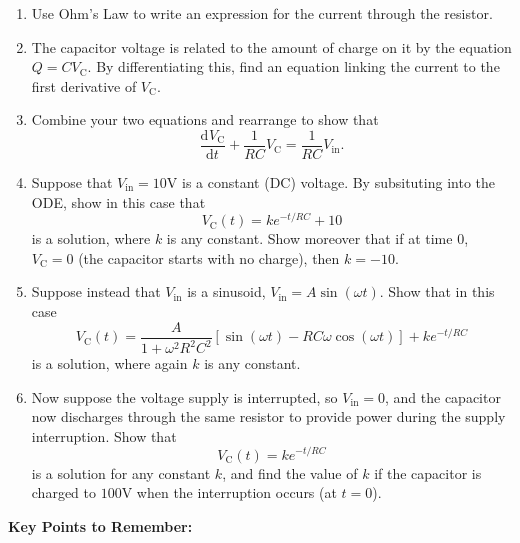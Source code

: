 \documentclass{article}
\newcommand{\deriv}[3][]{\frac{\mathrm{d}^{#1}#2}{\mathrm{d}#3^{#1}}}
\begin{document}
\begin{enumerate}
	\item Use Ohm's Law to write an expression for the current through the resistor. %
	\item The capacitor voltage is related to the amount of charge on it by the equation $Q=CV_\mathrm{C}$. By differentiating this, find an equation linking the current to the first derivative of $V_\mathrm{C}$. %
	\item Combine your two equations and rearrange to show that
		\[\deriv{V_\mathrm{C}}{t}+\frac{1}{RC}V_\mathrm{C} = \frac{1}{RC} V_\mathrm{in}.\]
	\item Suppose that $V_\mathrm{in}=10\mathrm{V}$ is a constant (DC) voltage. By subsituting into the ODE, show in this case that
		\[V_\mathrm{C}(t) = ke^{-t/RC}+10\]
		is a solution, where $k$ is any constant. Show moreover that if at time 0, $V_\mathrm{C}=0$ (the capacitor starts with no charge), then $k=-10$.
	\item Suppose instead that $V_\mathrm{in}$ is a sinusoid, $V_\mathrm{in}=A\sin(\omega t)$. Show that in this case
		\[V_\mathrm{C}(t) = \frac{A}{1+\omega^2 R^2 C^2}\left[\sin(\omega t)-RC\omega\cos(\omega t)\right] + ke^{-t/RC}\]
		is a solution, where again $k$ is any constant.
	\item Now suppose the voltage supply is interrupted, so $V_\mathrm{in}=0$, and the capacitor now discharges through the same resistor to provide power during the supply interruption. Show that
		\[V_\mathrm{C}(t)=ke^{-t/RC}\]
		is a solution for any constant $k$, and find the value of $k$ if the capacitor is charged to $100\mathrm{V}$ when the interruption occurs (at $t=0$).
\end{enumerate}














\clearpage




{\bf Key Points to Remember:}

\vspace{5mm}
\end{document}
